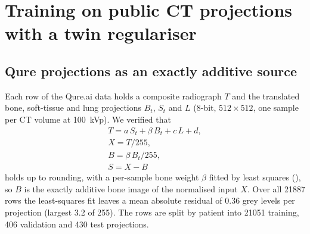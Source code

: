\section{Training on public CT projections with a twin regulariser}
\label{sec:method_v2}
\subsection{Qure projections as an exactly additive source}
Each row of the Qure.ai data holds a composite radiograph $T$ and the translated bone, soft-tissue and lung projections $B_t$, $S_t$ and $L$
(8-bit, $512\times512$, one sample per CT volume at 100~kVp). We verified that
\begin{equation}
\begin{gathered}
T=a\,S_t+\beta\,B_t+c\,L+d,\\
X=T/255,\\
B=\beta\,B_t/255,\\
S=X-B
\end{gathered}
\label{eq:qure}
\end{equation}
holds up to rounding, with a per-sample bone weight $\beta$ fitted by least squares (), so $B$ is the exactly
additive bone image of the normalised input $X$. Over all \num{21887} rows the least-squares fit leaves a mean absolute residual of 0.36 grey levels per projection (largest 3.2 of 255).
The rows are split by patient into \num{21051} training, 406 validation and 430 test projections.

